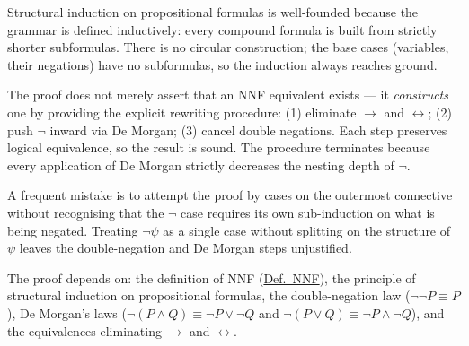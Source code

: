 \begin{remark*}
Structural induction on propositional formulas is well-founded because the
grammar is defined inductively: every compound formula is built from strictly
shorter subformulas. There is no circular construction; the base cases
(variables, their negations) have no subformulas, so the induction always
reaches ground.
\end{remark*}

\begin{remark*}
The proof does not merely assert that an NNF equivalent exists — it
\emph{constructs} one by providing the explicit rewriting procedure: (1)
eliminate $\rightarrow$ and $\leftrightarrow$; (2) push $\neg$ inward via De
Morgan; (3) cancel double negations. Each step preserves logical equivalence,
so the result is sound. The procedure terminates because every application of
De Morgan strictly decreases the nesting depth of $\neg$.
\end{remark*}

\begin{remark*}
A frequent mistake is to attempt the proof by cases on the outermost
connective without recognising that the $\neg$ case requires its own
sub-induction on what is being negated. Treating $\neg\psi$ as a single case
without splitting on the structure of $\psi$ leaves the double-negation and
De Morgan steps unjustified.
\end{remark*}

\begin{remark*}[Dependencies]
The proof depends on: the definition of NNF (\hyperref[def:nnf]{Def.\ NNF}),
the principle of structural induction on propositional formulas, the
double-negation law ($\neg\neg P \equiv P$), De Morgan's laws ($\neg(P
\wedge Q) \equiv \neg P \vee \neg Q$ and $\neg(P \vee Q) \equiv \neg P
\wedge \neg Q$), and the equivalences eliminating $\rightarrow$ and
$\leftrightarrow$.
\end{remark*}
